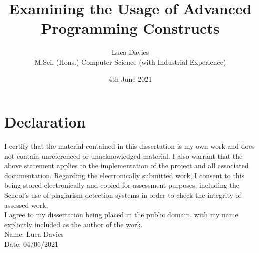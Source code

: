 \documentclass{article}
\title{\textbf{Examining the Usage of Advanced Programming Constructs}}
\author{
Luca Davies \\ M.Sci. (Hons.) Computer Science (with Industrial Experience)}
\date{4th June 2021}
\def\frontmatter{%
    \pagenumbering{roman}
    \setcounter{page}{1}
    \renewcommand{\thesection}{\roman{section}}
}%
\begin{document}
\maketitle

\frontmatter

\newpage
\section*{Declaration}
    I certify that the material contained in this dissertation is my own work and does not contain unreferenced or unacknowledged material. I also warrant that the above statement applies to the implementation of the project and all associated documentation. Regarding the electronically submitted work, I consent to this being stored electronically and copied for assessment purposes, including the School’s use of plagiarism detection systems in order to check the integrity of assessed work. \\
    I agree to my dissertation being placed in the public domain, with my name explicitly included as the author of the work. \\
    
    \noindent
    Name: Luca Davies\\
    Date: 04/06/2021
\newpage
\end{document}
